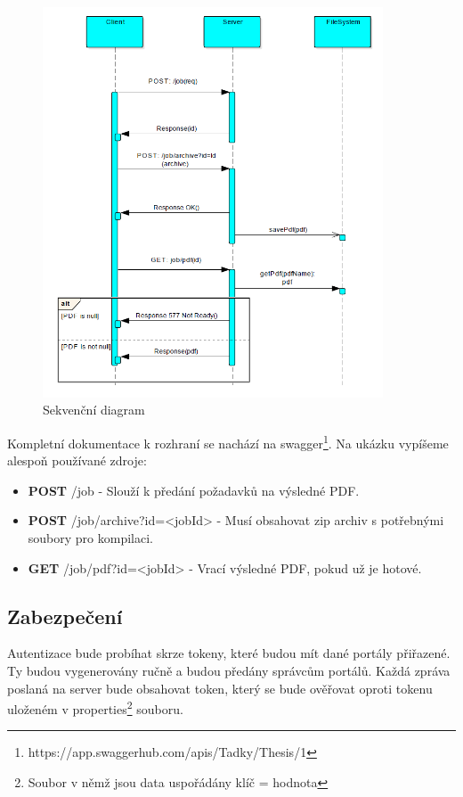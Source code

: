 \begin{figure}[H]
	\includegraphics[width=0.9\textwidth]{diagram}
	\centering
	\caption{Sekvenční diagram}
	\label{fig:seq}
\end{figure}

Kompletní dokumentace k rozhraní se nachází na swagger\footnote{https://app.swaggerhub.com/apis/Tadky/Thesis/1}. Na ukázku vypíšeme alespoň používané zdroje:
\begin{itemize}
	\item \textbf{POST} {\ttfamily /job} - Slouží k předání požadavků na výsledné PDF.
	\item \textbf{POST} {\ttfamily /job/archive?id=<jobId>} - Musí obsahovat zip archiv s potřebnými soubory pro kompilaci.
	\item \textbf{GET} {\ttfamily /job/pdf?id=<jobId>} - Vrací výsledné PDF, pokud už je hotové.
\end{itemize}

\subsection{Zabezpečení}
Autentizace bude probíhat skrze tokeny, které budou mít dané portály přiřazené. Ty budou vygenerovány ručně a budou předány správcům portálů. Každá zpráva poslaná na server bude obsahovat token, který se bude ověřovat oproti tokenu uloženém v properties\footnote{Soubor v němž jsou data uspořádány klíč = hodnota} souboru.

